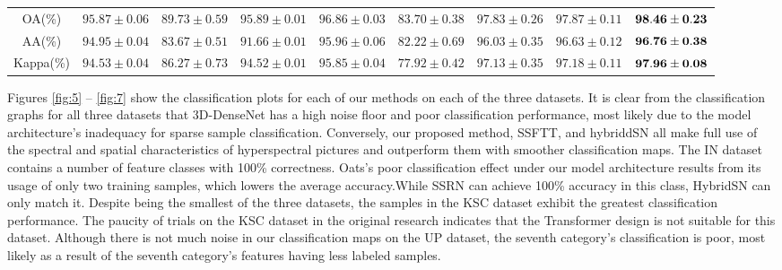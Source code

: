 \documentclass[]{interact}
\theoremstyle{plain}%
\theoremstyle{definition}
\theoremstyle{remark}
\begin{document}
\begin{table}[H]
{\begin{tabular}{ccccccccc}
        \midrule
       OA(\%)    &$95.87\pm0.06$ &$89.73\pm0.59$ &$95.89\pm0.01$ &$96.86\pm0.03$ &$83.70\pm0.38$  &$97.83\pm0.26$ &$97.87\pm0.11$   &${\bf98.46\pm0.23}$   \\
       AA(\%)    &$94.95\pm0.04$ &$83.67\pm0.51$ &$91.66\pm0.01$ &$95.96\pm0.06$ &$82.22\pm0.69$  &$96.03\pm0.35$ &$96.63\pm0.12$   &${\bf96.76\pm0.38}$  \\
       Kappa(\%) &$94.53\pm0.04$ &$86.27\pm0.73$ &$94.52\pm0.01$ &$95.85\pm0.04$ &$77.92\pm0.42$  &$97.13\pm0.35$ &$97.18\pm0.11$   &${\bf97.96\pm0.08}$    \\
		\bottomrule%
	\end{tabular}}
\end{table}
Figures \ref{fig:5} -- \ref{fig:7} show the classification plots for each of our methods on each of the three datasets. It is clear from the classification graphs for all three datasets that 3D-DenseNet has a high noise floor and poor classification performance, most likely due to the model architecture's inadequacy for sparse sample classification. Conversely, our proposed method, SSFTT, and hybriddSN all make full use of the spectral and spatial characteristics of hyperspectral pictures and outperform them with smoother classification maps. The IN dataset contains a number of feature classes with 100\% correctness. Oats's poor classification effect under our model architecture results from its usage of only two training samples, which lowers the average accuracy.While SSRN can achieve 100\% accuracy in this class, HybridSN can only match it. Despite being the smallest of the three datasets, the samples in the KSC dataset exhibit the greatest classification performance. The paucity of trials on the KSC dataset in the original research indicates that the Transformer design is not suitable for this dataset. Although there is not much noise in our classification maps on the UP dataset, the seventh category's classification is poor, most likely as a result of the seventh category's features having less labeled samples. 
\end{document}
